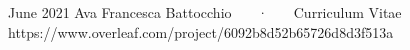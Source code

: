 \documentclass[11pt, letterpaper, draft]{academic-cv}
\begin{document}
\makecvheader

\makecvfooter
  {June 2021}
  {Ava Francesca Battocchio ~~~·~~~ Curriculum Vitae}
  {\thepage}
https://www.overleaf.com/project/6092b8d52b65726d8d3f513a







%



\end{document}
